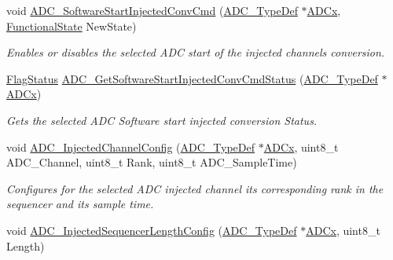 \begin{DoxyCompactItemize}
void \mbox{\hyperlink{group___a_d_c___private___functions_ga5b141d5dbf5f417a11dfa622c8c149d3}{A\+D\+C\+\_\+\+Software\+Start\+Injected\+Conv\+Cmd}} (\mbox{\hyperlink{struct_a_d_c___type_def}{A\+D\+C\+\_\+\+Type\+Def}} $\ast$\mbox{\hyperlink{group___s_t_m32_f1_x_x___n_u_c_l_e_o___l_o_w___l_e_v_e_l___exported___constants_gab44c1065d38c298955fc028346984340}{A\+D\+Cx}}, \mbox{\hyperlink{group___exported__types_gac9a7e9a35d2513ec15c3b537aaa4fba1}{Functional\+State}} New\+State)
\begin{DoxyCompactList}\small\item\em Enables or disables the selected A\+DC start of the injected channels conversion. \end{DoxyCompactList}\item 
\mbox{\hyperlink{group___exported__types_ga89136caac2e14c55151f527ac02daaff}{Flag\+Status}} \mbox{\hyperlink{group___a_d_c___private___functions_ga8765f8835b8cfed13dce3d8d71767dcc}{A\+D\+C\+\_\+\+Get\+Software\+Start\+Injected\+Conv\+Cmd\+Status}} (\mbox{\hyperlink{struct_a_d_c___type_def}{A\+D\+C\+\_\+\+Type\+Def}} $\ast$\mbox{\hyperlink{group___s_t_m32_f1_x_x___n_u_c_l_e_o___l_o_w___l_e_v_e_l___exported___constants_gab44c1065d38c298955fc028346984340}{A\+D\+Cx}})
\begin{DoxyCompactList}\small\item\em Gets the selected A\+DC Software start injected conversion Status. \end{DoxyCompactList}\item 
void \mbox{\hyperlink{group___a_d_c___private___functions_gae2b44bff080184e1cf6f2cb6b9bb3e59}{A\+D\+C\+\_\+\+Injected\+Channel\+Config}} (\mbox{\hyperlink{struct_a_d_c___type_def}{A\+D\+C\+\_\+\+Type\+Def}} $\ast$\mbox{\hyperlink{group___s_t_m32_f1_x_x___n_u_c_l_e_o___l_o_w___l_e_v_e_l___exported___constants_gab44c1065d38c298955fc028346984340}{A\+D\+Cx}}, uint8\+\_\+t A\+D\+C\+\_\+\+Channel, uint8\+\_\+t Rank, uint8\+\_\+t A\+D\+C\+\_\+\+Sample\+Time)
\begin{DoxyCompactList}\small\item\em Configures for the selected A\+DC injected channel its corresponding rank in the sequencer and its sample time. \end{DoxyCompactList}\item 
void \mbox{\hyperlink{group___a_d_c___private___functions_ga24eba90bc3ee955e07659a605011710d}{A\+D\+C\+\_\+\+Injected\+Sequencer\+Length\+Config}} (\mbox{\hyperlink{struct_a_d_c___type_def}{A\+D\+C\+\_\+\+Type\+Def}} $\ast$\mbox{\hyperlink{group___s_t_m32_f1_x_x___n_u_c_l_e_o___l_o_w___l_e_v_e_l___exported___constants_gab44c1065d38c298955fc028346984340}{A\+D\+Cx}}, uint8\+\_\+t Length)

\end{DoxyCompactItemize}
